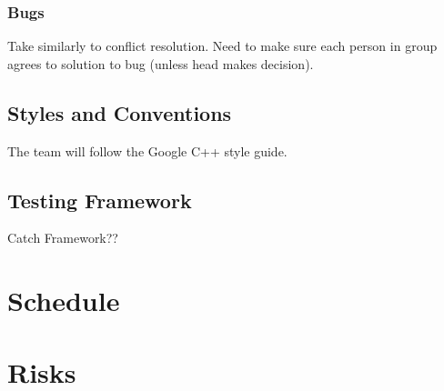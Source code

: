 \documentclass[11pt, titlepage]{article}
\begin{document}
    \subsubsection{Bugs} 
   	
    	Take similarly to conflict resolution.  Need to make sure each person in group agrees to solution to bug (unless head makes decision).
    
    \subsection{Styles and Conventions}
    	The team will follow the Google C++ style guide.
    
    \subsection{Testing Framework}
    	Catch Framework??
    
    \section{Schedule}
    
    
    \section{Risks}
    
\end{document}
